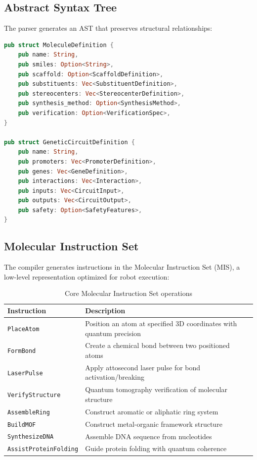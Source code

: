 \documentclass[12pt,a4paper]{article}
\begin{document}
\subsection{Abstract Syntax Tree}

The parser generates an AST that preserves structural relationships:

\begin{lstlisting}[language=Rust,caption={Core AST structures}]
pub struct MoleculeDefinition {
    pub name: String,
    pub smiles: Option<String>,
    pub scaffold: Option<ScaffoldDefinition>,
    pub substituents: Vec<SubstituentDefinition>,
    pub stereocenters: Vec<StereocenterDefinition>,
    pub synthesis_method: Option<SynthesisMethod>,
    pub verification: Option<VerificationSpec>,
}

pub struct GeneticCircuitDefinition {
    pub name: String,
    pub promoters: Vec<PromoterDefinition>,
    pub genes: Vec<GeneDefinition>,
    pub interactions: Vec<Interaction>,
    pub inputs: Vec<CircuitInput>,
    pub outputs: Vec<CircuitOutput>,
    pub safety: Option<SafetyFeatures>,
}
\end{lstlisting}

\subsection{Molecular Instruction Set}

The compiler generates instructions in the Molecular Instruction Set (MIS), a low-level representation optimized for robot execution:

\begin{table}[H]
\centering
\begin{tabular}{lp{8cm}}
\toprule
\textbf{Instruction} & \textbf{Description} \\
\midrule
\texttt{PlaceAtom} & Position an atom at specified 3D coordinates with quantum precision \\
\texttt{FormBond} & Create a chemical bond between two positioned atoms \\
\texttt{LaserPulse} & Apply attosecond laser pulse for bond activation/breaking \\
\texttt{VerifyStructure} & Quantum tomography verification of molecular structure \\
\texttt{AssembleRing} & Construct aromatic or aliphatic ring system \\
\texttt{BuildMOF} & Construct metal-organic framework structure \\
\texttt{SynthesizeDNA} & Assemble DNA sequence from nucleotides \\
\texttt{AssistProteinFolding} & Guide protein folding with quantum coherence \\
\bottomrule
\end{tabular}
\caption{Core Molecular Instruction Set operations}
\end{table}
\end{document}
